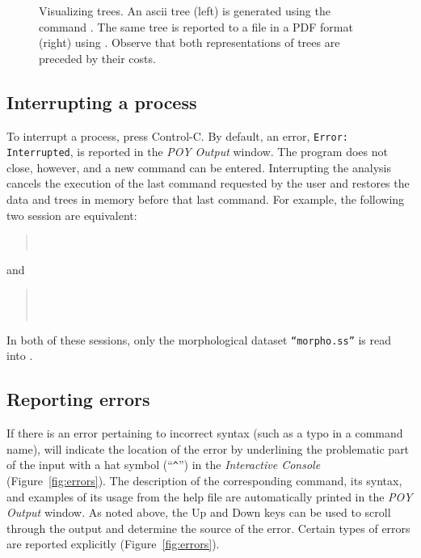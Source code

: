 {\begin{figure}
\begin{minipage}[c]{0.5\textwidth}
\end{minipage}
\caption{Visualizing trees. An ascii tree (left) is generated using the command
. The same tree is reported to a file in a PDF format (right) using 
. Observe that both representations of trees  are preceded by their costs.}
\label{fig:trees}
\end{figure}

\subsection{Interrupting a process}
To interrupt a process, press Control-C. By default, an error, \texttt{Error:}\\ \texttt{Interrupted}, is reported in the 
\emph{POY Output} window. The program does not close, however, and a new command can be entered. Interrupting 
the analysis cancels the execution of the last command requested by the user and restores the data and trees in memory 
before that last command. For example, the following two session are equivalent: 

\begin{quote}
 \\
\end{quote}
and

\begin{quote}
 \\
 \\
\end{quote}

In both of these sessions, only the morphological dataset \texttt{``morpho.ss''} is read into \poy.

\subsection{Reporting errors}
If there is an error pertaining to incorrect syntax (such as a typo in a command name), \poy will indicate the location 
of the error by underlining the problematic part of the input with a hat symbol (``\texttt{\^}'') in the \emph{Interactive Console} 
(Figure~\ref{fig:errors}). The description of the corresponding command, its syntax, and examples of its usage 
from the help file are automatically printed in the \emph{POY Output} window. As noted above, the Up and Down 
keys can be used to scroll through the output and determine the source of the error. Certain types of errors are reported 
explicitly (Figure~\ref{fig:errors}).

}
